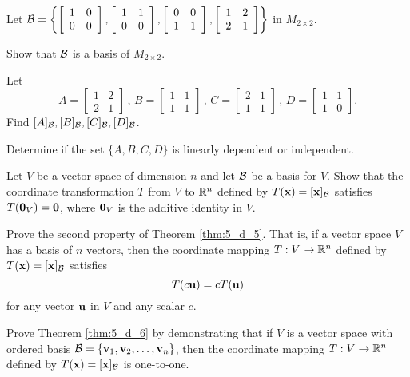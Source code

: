 \item Let $\mathcal{B}=\left\{ \left[\begin{array}{cc} 1&0\\0&0\end{array} \right], \left[\begin{array}{cc} 1&1\\0&0\end{array}\right], \left[\begin{array}{cc} 0&0\\1&1\end{array}\right], \left[\begin{array}{cc} 1&2\\2&1\end{array}\right] \right\}$ in $M_{2\times 2}$.
\ba 
\item Show that $\mathcal{B}$ is a basis of $M_{2\times 2}$.
\item Let 
\[ A = \left[\begin{array}{cc} 1&2\\2&1\end{array}\right] \, , \, B=\left[\begin{array}{cc} 1&1\\1&1\end{array}\right] \, , \, C= \left[\begin{array}{cc} 2&1\\1&1\end{array} \right]\, , \, D= \left[\begin{array}{cc} 1&1\\1&0\end{array}\right].\]
Find $[A]_{\mathcal{B}},[B]_{\mathcal{B}}, [C]_{\mathcal{B}}, [D]_{\mathcal{B}}$. 
\item Determine if the set $\{A, B, C, D\}$ is linearly dependent or independent.
\ea
	
\item Let $V$ be a vector space of dimension $n$ and let $\mathcal{B}$ be a basis for $V$. Show that the coordinate transformation $T$ from $V$ to $\mathbb{R}^n$ defined by $T(\mathbf{x}) = [\mathbf{x}]_{\mathcal{B}}$ satisfies $T(\mathbf{0}_V) = \mathbf{0}$, where $\mathbf{0}_V$ is the additive identity in $V$. 


\item Prove the second property of Theorem \ref{thm:5_d_5}. That is, if a vector space $V$ has a basis of $n$ vectors, then the coordinate mapping $T : V \to \mathbb{R}^n$ defined by $T(\mathbf{x}) = [\mathbf{x}]_{\mathcal{B}}$ satisfies
\[T(c\mathbf{u}) = cT(\mathbf{u})\]
for any vector $\mathbf{u}$ in $V$ and any scalar $c$. 

\item Prove Theorem \ref{thm:5_d_6} by demonstrating that if $V$ is a vector space with ordered basis $\mathcal{B} = \{\mathbf{v}_1, \mathbf{v}_2, \ldots, \mathbf{v}_n\}$, then the coordinate mapping $T : V \to \mathbb{R}^n$ defined by $T(\mathbf{x}) = [\mathbf{x}]_{\mathcal{B}}$ is one-to-one.  


